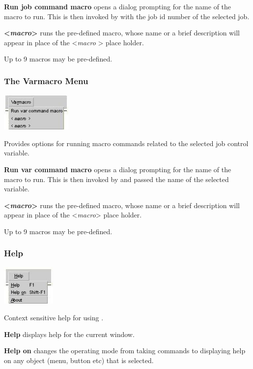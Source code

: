\textbf{Run job command macro} opens a dialog prompting for the name of
the macro to run. This is then invoked by \XmbtqName{} with the job id number
of the selected job.

\textbf{{\textless}}\textbf{\textit{macro}}\textbf{{\textgreater}} runs
the pre-defined macro, whose name or a brief description will appear in
place of the {\textless}\textit{macro} {\textgreater} place holder.

Up to 9 macros may be pre-defined.

\subsubsection[The Varmacro Menu]{The Varmacro Menu}
 \includegraphics[width=3.454cm,height=1.879cm]{img/ref24.jpg} 

Provides options for running macro commands related to the selected job control variable.

\textbf{Run var command macro} opens a dialog prompting for the name of the macro to run. This is then invoked by \PrXmbtq{}
and passed the name of the selected variable.

\textbf{{\textless}}\textbf{\textit{macro}}\textbf{{\textgreater}} runs the pre-defined macro, whose name or a brief description will appear in
place of the {\textless}\textit{macro}{\textgreater} place holder.

Up to 9 macros may be pre-defined.

\subsubsection{Help}
 \includegraphics[width=2.641cm,height=1.983cm]{img/ref25.jpg} 

Context sensitive help for using \PrXmbtq{}.

\textbf{Help} displays help for the current window.

\textbf{Help on} changes the operating mode from taking commands to displaying help on any object (menu, button etc) that is selected.


